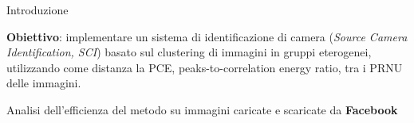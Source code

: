 
\begin{tframe}{Introduzione}

\vspace{0.5cm}

\textbf{Obiettivo}: implementare un sistema di identificazione di camera (\emph{Source Camera Identification, SCI}) basato sul clustering di immagini in gruppi eterogenei, utilizzando come distanza la PCE, peaks-to-correlation energy ratio, tra i PRNU delle immagini. 

\vspace{1cm}
Analisi dell'efficienza del metodo su immagini caricate e scaricate da \textbf{Facebook}

\end{tframe}